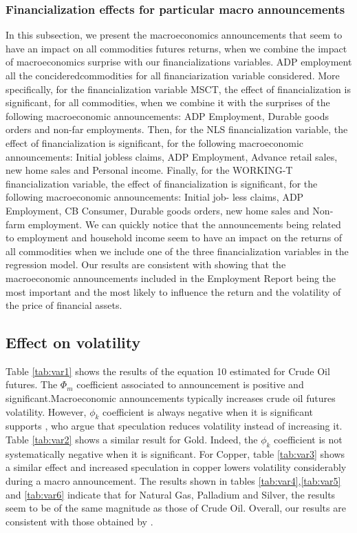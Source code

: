 \documentclass[12pt]{article}
\begin{document}
\subsubsection{Financialization effects for particular macro announcements}

 
  In this subsection, we present the macroeconomics announcements that seem to have an impact on all commodities futures returns, when we combine the impact of macroeconomics surprise with our financializations variables.  ADP employment  all the concideredcommodities for all financiarization variable considered. More specifically, for the financialization variable MSCT, the effect of financialization is significant, for all commodities, when we combine it with the surprises of the following macroeconomic announcements: ADP Employment, Durable goods orders and non-far employments. Then, for the NLS financialization variable, the effect of financialization is significant, for the following macroeconomic announcements: Initial jobless claims, ADP Employment, Advance retail sales, new home sales and Personal income. Finally, for the WORKING-T financialization variable, the effect of financialization is significant, for the following macroeconomic announcements: Initial job- less claims, ADP Employment, CB Consumer, Durable goods orders, new home sales and Non-farm employment. We can quickly notice that the announcements being related to employment and household income seem to have an impact on the returns of all commodities when we include one of the three financialization variables in the regression model. Our results are consistent with \citet{hordahl2015expectations} showing that the macroeconomic announcements included in the Employment Report being the most important and the most likely to influence the return and the volatility of the price of financial assets.
  
	\subsection{Effect on volatility}
	Table \ref{tab:var1} shows the results of the equation 10 estimated for Crude Oil futures. The $\Phi_m$ coefficient associated to announcement is positive and significant.Macroeconomic announcements typically increases crude oil futures volatility. However, $\phi_k$ coefficient  is always negative when it is significant supports \citet{brunetti2016speculators}, who argue that speculation reduces volatility instead of increasing it. Table \ref{tab:var2} shows a similar result for Gold. Indeed, the $\phi_k$  coefficient is not systematically negative when it is significant. For Copper, table \ref{tab:var3} shows a similar effect and increased speculation in copper lowers volatility considerably during a macro announcement. The results shown in tables \ref{tab:var4},\ref{tab:var5} and \ref{tab:var6} indicate that for Natural Gas, Palladium and Silver, the results seem to be of the same magnitude as those of Crude Oil.  Overall, our results are consistent with those obtained by \citet{brunetti2016speculators}.
	
\end{document}
